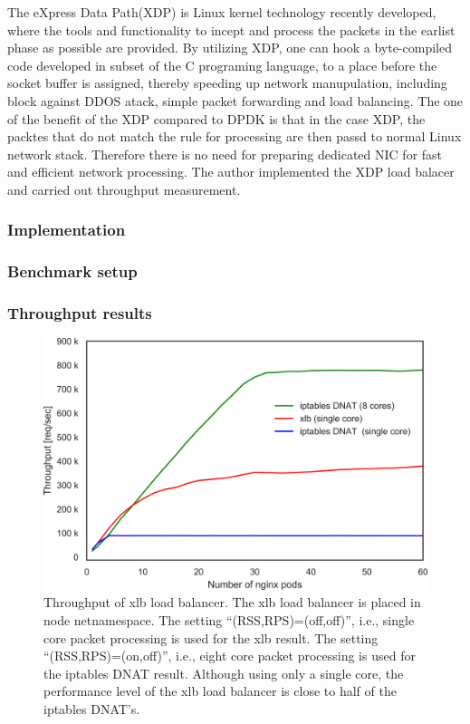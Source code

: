 The eXpress Data Path(XDP) is Linux kernel technology recently developed, where the tools and functionality to incept and process the packets in the earlist phase as possible are provided.
By utilizing XDP, one can hook a byte-compiled code developed in subset of the C programing language, to a place before the socket buffer is assigned, thereby speeding up network manupulation, including block against DDOS atack, simple packet forwarding and load balancing.
The one of the benefit of the XDP compared to DPDK is that in the case XDP, the packtes that do not match the rule for processing are then passd to normal Linux network stack.
Therefore there is no need for preparing dedicated NIC for fast and efficient network processing.
The author implemented the XDP load balacer and carried out throughput measurement.

\subsubsection{Implementation}

\subsubsection{Benchmark setup}

\subsubsection{Throughput results }



\begin{figure}[h]
  \centering
  \includegraphics[width=0.8\columnwidth]{Figs/xlb_iptables_dnat_10g}
  \par\bigskip
  \centering
  \begin{minipage}{0.9\columnwidth}
    \caption[Throughput of xlb load balancer]{
      Throughput of xlb load balancer.
      The xlb load balancer is placed in node netnamespace.
      The setting \enquote{(RSS,RPS)=(off,off)}, i.e., single core packet processing is used for the xlb result.
      The setting \enquote{(RSS,RPS)=(on,off)}, i.e., eight core packet processing is used for the iptables DNAT result.
      Although using only a single core, the performance level of the xlb load balancer is close to half of the iptables DNAT's.
    }
    \label{fig:xlb_iptables_dnat_10g}
  \end{minipage}
\end{figure}


